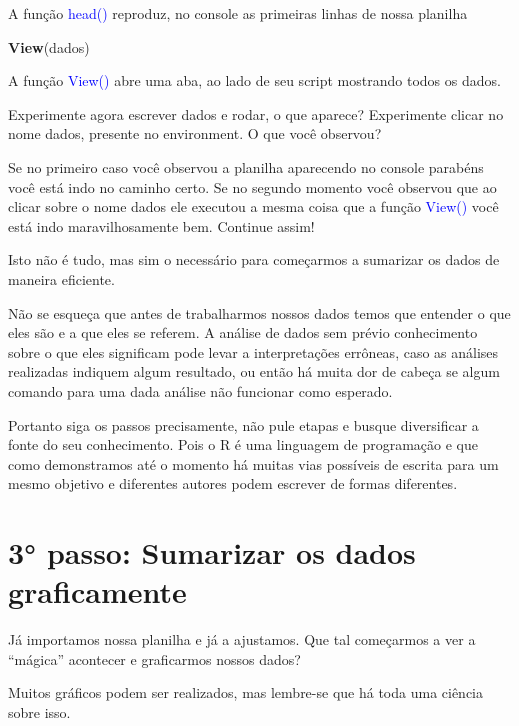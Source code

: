 \documentclass[14pt,titlepage, oneside, openany, a4paper]{book}
\newenvironment{Shaded}{\begin{snugshade}}{\end{snugshade}}
\newcommand{\KeywordTok}[1]{\textcolor[rgb]{0.13,0.29,0.53}{\textbf{#1}}}
\newcommand{\NormalTok}[1]{#1}
\begin{document}
A função \textcolor{blue}{head()} reproduz, no console as primeiras linhas de nossa planilha

\begin{Shaded}
\begin{Highlighting}[]
\KeywordTok{View}\NormalTok{(dados)}
\end{Highlighting}
\end{Shaded}

A função \textcolor{blue}{View()} abre uma aba, ao lado de seu script mostrando todos os dados.

Experimente agora escrever dados e rodar, o que aparece? Experimente clicar no nome dados, presente no environment. O que você observou?

Se no primeiro caso você observou a planilha aparecendo no console parabéns você está indo no caminho certo. Se no segundo momento você observou que ao clicar sobre o nome dados ele executou a mesma coisa que a função \textcolor{blue}{View()} você está indo maravilhosamente bem. Continue assim!

Isto não é tudo, mas sim o necessário para começarmos a sumarizar os dados de maneira eficiente.

Não se esqueça que antes de trabalharmos nossos dados temos que entender o que eles são e a que eles se referem. A análise de dados sem prévio conhecimento sobre o que eles significam pode levar a interpretações errôneas, caso as análises realizadas indiquem algum resultado, ou então há muita dor de cabeça se algum comando para uma dada análise não funcionar como esperado.

Portanto siga os passos precisamente, não pule etapas e busque diversificar a fonte do seu conhecimento. Pois o R é uma linguagem de programação e que como demonstramos até o momento há muitas vias possíveis de escrita para um mesmo objetivo e diferentes autores podem escrever de formas diferentes.

\hypertarget{passo-sumarizar-os-dados-graficamente}{%
\section{3° passo: Sumarizar os dados graficamente}\label{passo-sumarizar-os-dados-graficamente}}

Já importamos nossa planilha e já a ajustamos. Que tal começarmos a ver a ``mágica'' acontecer e graficarmos nossos dados?

Muitos gráficos podem ser realizados, mas lembre-se que há toda uma ciência sobre isso.
\end{document}
